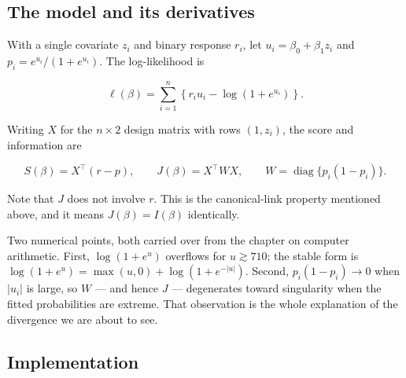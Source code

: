 \documentclass[
  letterpaper,
  DIV=11,
  numbers=noendperiod]{scrreprt}
\begin{document}
\subsection{The model and its
derivatives}\label{the-model-and-its-derivatives}

With a single covariate \(z_i\) and binary response \(r_i\), let
\(u_i = \beta_0 + \beta_1 z_i\) and \(p_i = e^{u_i}/(1 + e^{u_i})\). The
log-likelihood is

\[
\ell(\beta) = \sum_{i=1}^{n}\left\{ r_i u_i - \log\left(1 + e^{u_i}\right) \right\}.
\]

Writing \(X\) for the \(n \times 2\) design matrix with rows
\((1, z_i)\), the score and information are

\[
S(\beta) = X^{\top}(r - p), \qquad
J(\beta) = X^{\top} W X, \qquad W = \operatorname{diag}\{p_i(1 - p_i)\}.
\]

Note that \(J\) does not involve \(r\). This is the canonical-link
property mentioned above, and it means \(J(\beta) = I(\beta)\)
identically.

Two numerical points, both carried over from the chapter on computer
arithmetic. First, \(\log(1 + e^{u})\) overflows for \(u \gtrsim 710\);
the stable form is \(\log(1+e^u) = \max(u,0) + \log(1 + e^{-|u|})\).
Second, \(p_i(1-p_i) \to 0\) when \(|u_i|\) is large, so \(W\) --- and
hence \(J\) --- degenerates toward singularity when the fitted
probabilities are extreme. That observation is the whole explanation of
the divergence we are about to see.

\subsection{Implementation}\label{implementation}
\end{document}
